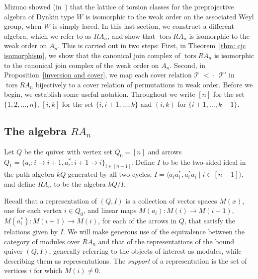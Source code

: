 \documentclass[ALCO,ThmDefs,Unicode,epreuves]{cedram}
\DeclareMathOperator{\tors}{tors}
\newcommand{\kk}{k}
\newcommand{\calT}{\mathcal{T}}
\newcommand{\covered}{{\,\,<\!\!\!\!\cdot\,\,\,}}
\renewcommand{\1}{\hat{1}}
\newcommand{\0}{\hat{0}}
\newcommand{\newword}[1]{\emph{#1}}
\begin{document}
Mizuno showed (in~\cite[Theorem~2.3]{Miz}) that the lattice of torsion classes for the preprojective algebra of Dynkin type $W$ is isomorphic to the weak order on the associated Weyl group, when $W$ is simply laced.
In this last section, we construct a different algebra, which we
refer to as $RA_n$, and show that $\tors RA_n$ is isomorphic to the weak
order on $A_n$. 
This is carried out in two steps:
First, in Theorem~\ref{thm: cjc isomorphism}, we show that the canonical join complex of $\tors RA_n$ is isomorphic to the canonical join complex of the weak order on $A_n$.
Second, in Proposition~\ref{inversion and cover}, we map each cover relation $\calT\covered \calT'$ in $\tors RA_n$ bijectively to a cover relation of permutations in weak order.
Before we begin, we establish some useful notation.
Throughout we write $[n]$ for the set $\{1,2,\ldots, n\}$, $[i,k]$ for
the set $\{i, i+1, \ldots, k\}$ and $(i,k)$ for $\{i+1, \ldots,
k-1\}$.

\subsection{The algebra \texorpdfstring{$RA_n$}{RAn}}\label{RA_n background}
Let $Q$ be the quiver with vertex set $Q_0=[n]$ and arrows $Q_1=\{a_i:
i\rightarrow i+1, a_i^*: i+1\rightarrow i\}_{i\in [n-1]}$. Define $I$ to be the two-sided ideal in the
 path algebra $\kk
 Q$ generated by all two-cycles, $I=\langle a_ia_i^*, a_i^*a_i \mid
 i\in [n-1]\rangle$, and define $RA_n$ to be the algebra $\kk Q/I$.

Recall that a representation of $(Q,I)$ is a collection of vector spaces $M(x)$, one for each
vertex $i\in Q_0$, and linear maps $M(a_i): M(i)\rightarrow M(i+1)$,
$M(a_i^*):M(i+1)\rightarrow M(i)$, for each of the arrows in $Q$, that satisfy the
relations given by $I$. We will make generous use of the equivalence between the category of
modules over $RA_n$ and that of the representations of the bound
quiver $(Q, I)$, generally referring to the objects of interest as
modules, while describing them as representations.
 The \newword{support} of a representation is the set of vertices $i$ for which $M(i)\neq 0$.
\end{document}
